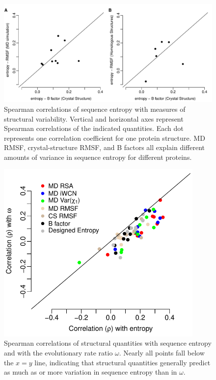 \documentclass[smallextended]{svjour3}
\begin{document}
\begin{figure}[tbh]
\begin{center}
    \includegraphics[width=6.5in]{cor_entropy_bfca_rmsf.pdf}
\end{center}
\caption{Spearman correlations of sequence entropy with measures of structural variability.
Vertical and horizontal axes represent Spearman correlations of the indicated quantities. Each dot represents one correlation coefficient for one protein structure. MD RMSF, crystal-structure RMSF, and B factors all explain different amounts of variance in sequence entropy for different proteins.}
\label{fig:cor_entropy_bfca_rmsf}
\end{figure}

\begin{figure}[tbh]
\begin{center}
    \includegraphics[width=4in]{cor_entropy_omega.pdf}
\end{center}
\caption{Spearman correlations of structural quantities with sequence entropy and with the evolutionary rate ratio $\omega$. Nearly all points fall below the $x=y$ line, indicating that structural quantities generally predict as much as or more variation in sequence entropy than in $\omega$.}
\label{fig:cor_entropy_omega}
\end{figure}
\end{document}
